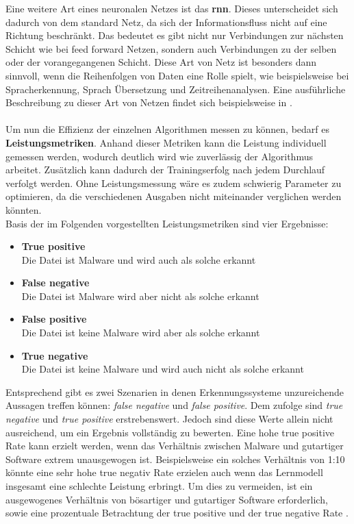 \documentclass[
    12pt, %
    DIV10,
    ngerman, %
    a4paper, %
    oneside, %
    titlepage, %
    parskip=half, %
    headings=normal, %
    listof=totoc, %
    bibliography=totoc, %
    index=totoc, %
    captions=tableheading, %
    final %
]{scrreprt}
\begin{document}
Eine weitere Art eines neuronalen Netzes ist das \textbf{\ac{rnn}}. Dieses unterscheidet sich dadurch von dem standard Netz, da sich der Informationsfluss nicht auf eine Richtung beschränkt. Das bedeutet es gibt nicht nur Verbindungen zur nächsten Schicht wie bei feed forward Netzen, sondern auch Verbindungen zu der selben oder der vorangegangenen Schicht. Diese Art von Netz ist besonders dann sinnvoll, wenn die Reihenfolgen von Daten eine Rolle spielt, wie beispielsweise bei Spracherkennung, Sprach Übersetzung und Zeitreihenanalysen. Eine ausführliche Beschreibung zu dieser Art von Netzen findet sich beispielsweise in \textcite{ravichandiran2018hands}.
\\\\
Um nun die Effizienz der einzelnen Algorithmen messen zu können, bedarf es \textbf{Leistungsmetriken}. Anhand dieser Metriken kann die Leistung individuell gemessen werden, wodurch deutlich wird wie zuverlässig der Algorithmus arbeitet. Zusätzlich kann dadurch der Trainingserfolg nach jedem Durchlauf verfolgt werden. Ohne Leistungsmessung wäre es zudem schwierig Parameter zu optimieren, da die verschiedenen Ausgaben nicht miteinander verglichen werden könnten.\\
Basis der im Folgenden vorgestellten Leistungsmetriken sind vier Ergebnisse:
\begin{itemize}
\item \textbf{True positive}\\ Die Datei ist Malware und wird auch als solche erkannt
\item \textbf{False negative}\\ Die Datei ist Malware wird aber nicht als solche erkannt
\item \textbf{False positive}\\ Die Datei ist keine Malware wird aber als solche erkannt
\item \textbf{True negative}\\ Die Datei ist keine Malware und wird auch nicht als solche erkannt
\end{itemize}
Entsprechend gibt es zwei Szenarien in denen Erkennungssysteme unzureichende Aussagen treffen können: \emph{false negative} und \emph{false positive}. Dem zufolge sind \emph{true negative} und \emph{true positive} erstrebenswert. Jedoch sind diese Werte allein nicht ausreichend, um ein Ergebnis vollständig zu bewerten. Eine hohe true positive Rate kann erzielt werden, wenn das Verhältnis zwischen Malware und gutartiger Software extrem unausgewogen ist. Beispielsweise ein solches Verhältnis von 1:10 könnte eine sehr hohe true negativ Rate erzielen auch wenn das Lernmodell insgesamt eine schlechte Leistung erbringt. Um dies zu vermeiden, ist ein ausgewogenes Verhältnis von bösartiger und gutartiger Software erforderlich, sowie eine prozentuale Betrachtung der true positive und der true negative Rate \parencite{Aldwairi2018}.\\\\
\end{document}

